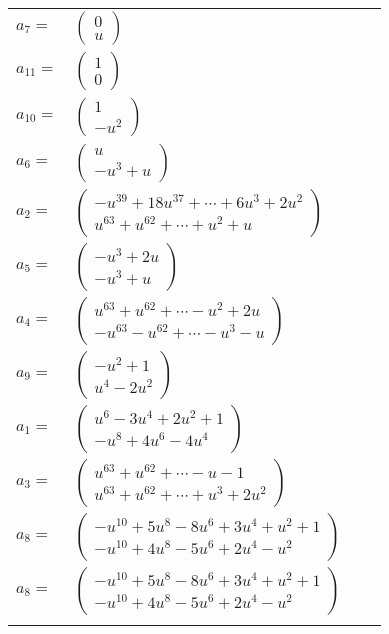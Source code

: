 \documentclass[1p]{elsarticle_modified}
\theoremstyle{definition}
\begin{document}
\begin{tabular}{m{7pt} m{180pt} m{7pt} m{180pt} }
\flushright $a_{7}=$&$\begin{pmatrix}0\\u\end{pmatrix}$ \\
\flushright $a_{11}=$&$\begin{pmatrix}1\\0\end{pmatrix}$ \\
\flushright $a_{10}=$&$\begin{pmatrix}1\\- u^2\end{pmatrix}$ \\
\flushright $a_{6}=$&$\begin{pmatrix}u\\- u^3+u\end{pmatrix}$ \\
\flushright $a_{2}=$&$\begin{pmatrix}- u^{39}+18 u^{37}+\cdots+6 u^3+2 u^2\\u^{63}+u^{62}+\cdots+u^2+u\end{pmatrix}$ \\
\flushright $a_{5}=$&$\begin{pmatrix}- u^3+2 u\\- u^3+u\end{pmatrix}$ \\
\flushright $a_{4}=$&$\begin{pmatrix}u^{63}+u^{62}+\cdots- u^2+2 u\\- u^{63}- u^{62}+\cdots- u^3- u\end{pmatrix}$ \\
\flushright $a_{9}=$&$\begin{pmatrix}- u^2+1\\u^4-2 u^2\end{pmatrix}$ \\
\flushright $a_{1}=$&$\begin{pmatrix}u^6-3 u^4+2 u^2+1\\- u^8+4 u^6-4 u^4\end{pmatrix}$ \\
\flushright $a_{3}=$&$\begin{pmatrix}u^{63}+u^{62}+\cdots- u-1\\u^{63}+u^{62}+\cdots+u^3+2 u^2\end{pmatrix}$ \\
\flushright $a_{8}=$&$\begin{pmatrix}- u^{10}+5 u^8-8 u^6+3 u^4+u^2+1\\- u^{10}+4 u^8-5 u^6+2 u^4- u^2\end{pmatrix}$\\ \flushright $a_{8}=$&$\begin{pmatrix}- u^{10}+5 u^8-8 u^6+3 u^4+u^2+1\\- u^{10}+4 u^8-5 u^6+2 u^4- u^2\end{pmatrix}$\\&\end{tabular}
\end{document}
